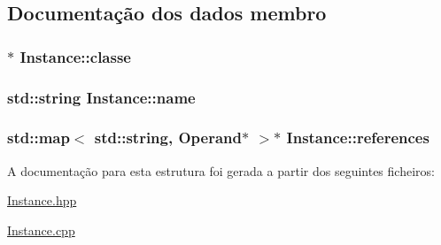 \subsection{Documentação dos dados membro}
\subsubsection[{\texorpdfstring{classe}{classe}}]{$\ast$ Instance\+::classe}\hypertarget{struct_instance_a7247d0aa8380ec112069ad6c78a11bd2}{}\label{struct_instance_a7247d0aa8380ec112069ad6c78a11bd2}
\subsubsection[{\texorpdfstring{name}{name}}]{\setlength{\rightskip}{0pt plus 5cm}std\+::string Instance\+::name}\hypertarget{struct_instance_a80e29939a8dac12ad5d8008f3df241af}{}\label{struct_instance_a80e29939a8dac12ad5d8008f3df241af}
\subsubsection[{\texorpdfstring{references}{references}}]{\setlength{\rightskip}{0pt plus 5cm}std\+::map$<$ std\+::string, {\bf Operand}$\ast$ $>$$\ast$ Instance\+::references}\hypertarget{struct_instance_a3262e6460c3b4fa873a3a439e77fdf7e}{}\label{struct_instance_a3262e6460c3b4fa873a3a439e77fdf7e}


A documentação para esta estrutura foi gerada a partir dos seguintes ficheiros\+:\begin{DoxyCompactItemize}
\item 
\hyperlink{_instance_8hpp}{Instance.\+hpp}\item 
\hyperlink{_instance_8cpp}{Instance.\+cpp}\end{DoxyCompactItemize}

